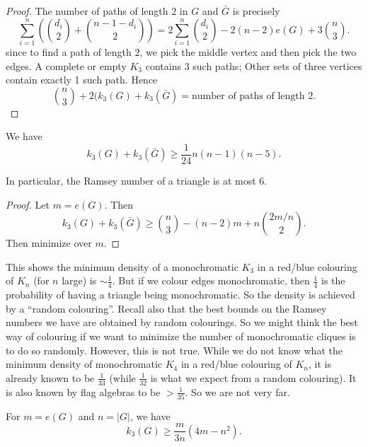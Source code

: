 \documentclass[a4paper]{article}
\begin{document}
\begin{proof}
  The number of paths of length $2$ in $G$ and $\bar{G}$ is precisely
  \[
    \sum_{i = 1}^n \left(\binom{d_i}{2} + \binom{n - 1 - d_i}{2}\right) = 2 \sum_{i = 1}^n \binom{d_i}{2} - 2 (n - 2) e(G) + 3 \binom{n}{3}.
  \]
  since to find a path of length $2$, we pick the middle vertex and then pick the two edges. A complete or empty $K_3$ contains $3$ such paths; Other sets of three vertices contain exactly 1 such path. Hence
  \[
    \binom{n}{3} + 2 (k_3(G) + k_3(\bar{G}) = \text{number of paths of length $2$}.
  \]
\end{proof}
\begin{cor}[Goodman, 1959]
  We have
  \[
    k_3(G) + k_3(\bar{G}) \geq \frac{1}{24} n(n - 1)(n - 5).
  \]
\end{cor}

In particular, the Ramsey number of a triangle is at most $6$.

\begin{proof}
  Let $m = e(G)$. Then
  \[
    k_3(G) + k_3(\bar{G}) \geq \binom{n}{3} - (n - 2) m + n \binom{2m/n}{2}. %
  \]
  Then minimize over $m$.
\end{proof}

This shows the minimum density of a monochromatic $K_3$ in a red/blue colouring of $K_n$ (for $n$ large) is $\sim \frac{1}{4}$. But if we colour edges monochromatic, then $\frac{1}{4}$ is the probability of having a triangle being monochromatic. So the density is achieved by a ``random colouring''. Recall also that the best bounds on the Ramsey numbers we have are obtained by random colourings. So we might think the best way of colouring if we want to minimize the number of monochromatic cliques is to do so randomly. However, this is not true. While we do not know what the minimum density of monochromatic $K_4$ in a red/blue colouring of $K_n$, it is already known to be $\frac{1}{33}$ (while $\frac{1}{32}$ is what we expect from a random colouring). It is also known by flag algebras to be $> \frac{1}{35}$. So we are not very far.

\begin{cor}
  For $m = e(G)$ and $n = |G|$, we have
  \[
    k_3(G) \geq \frac{m}{3n}(4m - n^2).
  \]
\end{cor}
\end{document}
